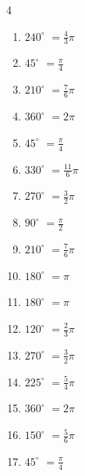 \begin{multicols}{4}
\begin{enumerate}
  \item $\displaystyle 240^{\circ}$
        $\displaystyle =\frac{4}{3}\pi$

  \item $\displaystyle 45^{\circ}$
        $\displaystyle =\frac{\pi}{4}$

  \item $\displaystyle 210^{\circ}$
        $\displaystyle =\frac{7}{6}\pi$

  \item $\displaystyle 360^{\circ}$
        $\displaystyle =2\pi$

  \item $\displaystyle 45^{\circ}$
        $\displaystyle =\frac{\pi}{4}$

  \item $\displaystyle 330^{\circ}$
        $\displaystyle =\frac{11}{6}\pi$

  \item $\displaystyle 270^{\circ}$
        $\displaystyle =\frac{3}{2}\pi$

  \item $\displaystyle 90^{\circ}$
        $\displaystyle =\frac{\pi}{2}$

  \item $\displaystyle 210^{\circ}$
        $\displaystyle =\frac{7}{6}\pi$

  \item $\displaystyle 180^{\circ}$
        $\displaystyle =\pi$

  \item $\displaystyle 180^{\circ}$
        $\displaystyle =\pi$

  \item $\displaystyle 120^{\circ}$
        $\displaystyle =\frac{2}{3}\pi$

  \item $\displaystyle 270^{\circ}$
        $\displaystyle =\frac{3}{2}\pi$

  \item $\displaystyle 225^{\circ}$
        $\displaystyle =\frac{5}{4}\pi$

  \item $\displaystyle 360^{\circ}$
        $\displaystyle =2\pi$

\columnbreak %

  \item $\displaystyle 150^{\circ}$
        $\displaystyle =\frac{5}{6}\pi$

  \item $\displaystyle 45^{\circ}$
        $\displaystyle =\frac{\pi}{4}$


\end{enumerate}
\end{multicols}
